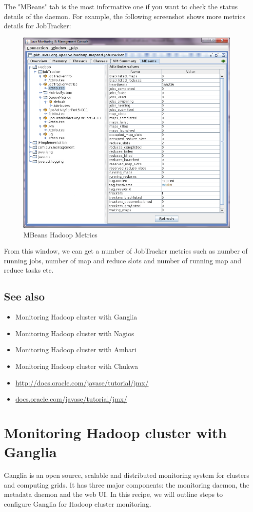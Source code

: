 The "MBeans" tab is the most informative one if you want to check the status details of the daemon. For example, the following screenshot shows more metrics details for JobTracker:
\begin{figure}[h]
  \centering
  \includegraphics[width=.8\textwidth]{figs/5163os_06_05.png}
  \caption{MBeans Hadoop Metrics}\label{fig:mbeans.hadoop.metrics}
\end{figure} 

From this window, we can get a number of JobTracker metrics such as number of running jobs, number of map and reduce slots and number of running map and reduce tasks etc.
\subsection*{See also}
\begin{itemize}
  \item Monitoring Hadoop cluster with Ganglia
  \item Monitoring Hadoop cluster with Nagios
  \item Monitoring Hadoop cluster with Ambari
  \item Monitoring Hadoop cluster with Chukwa
  \item \url{http://docs.oracle.com/javase/tutorial/jmx/}
  \item \url{docs.oracle.com/javase/tutorial/jmx/}
\end{itemize}

\section{Monitoring Hadoop cluster with Ganglia}
Ganglia is an open source, scalable and distributed monitoring system for clusters and computing grids. It has three major components: the monitoring daemon, the metadata daemon and the web UI. In this recipe, we will outline steps to configure Ganglia for Hadoop cluster monitoring.
